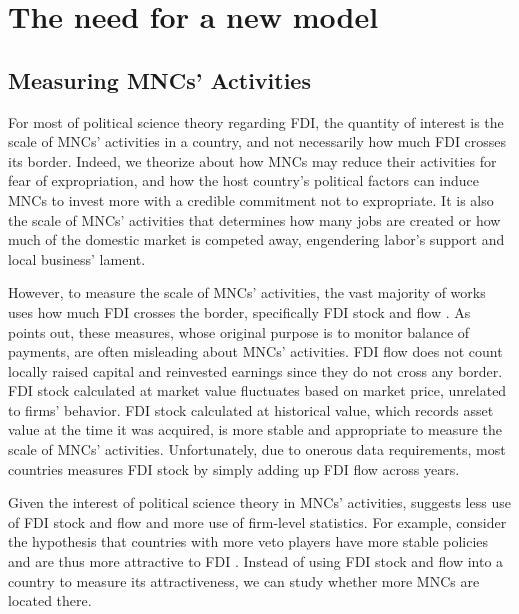 \section{The need for a new model}
\label{sec:literature_issues}

\subsection{Measuring MNCs' Activities}

For most of political science theory regarding FDI, the quantity of interest is the scale of MNCs' activities in a country, and not necessarily how much FDI crosses its border. Indeed, we theorize about how MNCs may reduce their activities for fear of expropriation, and how the host country's political factors can induce MNCs to invest more with a credible commitment not to expropriate. It is also the scale of MNCs' activities that determines how many jobs are created or how much of the domestic market is competed away, engendering labor's support and local business' lament.

However, to measure the scale of MNCs' activities, the vast majority of works uses how much FDI crosses the border, specifically FDI stock and flow \citep{Jensen2003, Ahlquist2006, Beazer2011, Graham2010}. As \citet{Kerner2014} points out, these measures, whose original purpose is to monitor balance of payments, are often misleading about MNCs' activities. FDI flow does not count locally raised capital and reinvested earnings since they do not cross any border. FDI stock calculated at market value fluctuates based on market price, unrelated to firms' behavior. FDI stock calculated at historical value, which records asset value at the time it was acquired, is more stable and appropriate to measure the scale of MNCs' activities. Unfortunately, due to onerous data requirements, most countries measures FDI stock by simply adding up FDI flow across years.

Given the interest of political science theory in MNCs' activities, \citet{Kerner2014} suggests less use of FDI stock and flow and more use of firm-level statistics. For example, consider the hypothesis that countries with more veto players have more stable policies and are thus more attractive to FDI \citep{Li2009a}. Instead of using FDI stock and flow into a country to measure its attractiveness, we can study whether more MNCs are located there.

